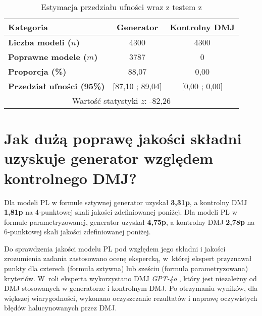 \begin{table}[H]
\caption{Estymacja przedziału ufności wraz z testem z}\label{tab:experiment:analysis4}
\centering%
\begin{tabular}{|l|c|c|}
\hline
\textbf{Kategoria} & \textbf{Generator} & \textbf{Kontrolny DMJ} \\
\hline
\textbf{Liczba modeli ($n$)} & 4300 & 4300 \\
\hline
\textbf{Poprawne modele ($m$)} & 3787 & 0 \\
\hline
\textbf{Proporcja (\%)} & 88,07 & 0,00 \\
\hline
\textbf{Przedział ufności (95\%)} & [87,10 ; 89,04] & [0,00 ; 0,00] \\
\hline
\multicolumn{3}{|c|}{Wartość statystyki \( z \): -82,26} \\
\hline
\end{tabular}
\end{table}

\section{Jak dużą poprawę jakości składni uzyskuje generator względem kontrolnego DMJ?}

Dla modeli PL w formule sztywnej generator uzyskał \textbf{3,31p}, a kontrolny DMJ \textbf{1,81p} na 4-punktowej skali jakości zdefiniowanej poniżej. Dla modeli PL w formule parametryzowanej, generator uzyskał \textbf{4,75p}, a kontrolny DMJ \textbf{2,78p} na 6-punktowej skali jakości zdefiniowanej poniżej.


Do sprawdzenia jakości modelu PL pod względem jego składni i jakości zrozumienia zadania zastosowano ocenę ekspercką, w~której ekspert przyznawał punkty dla czterech (formuła sztywna) lub sześciu (formuła parametryzowana) kryteriów. W~roli eksperta wykorzystano DMJ \textit{GPT-4o} \cite{TODO}, który jest niezależny od DMJ stosowanych w generatorze i kontrolnym DMJ. Po otrzymaniu wyników, dla większej wiarygodności, wykonano oczyszczanie rezultatów i naprawę oczywistych błędów halucynowanych przez DMJ. %


